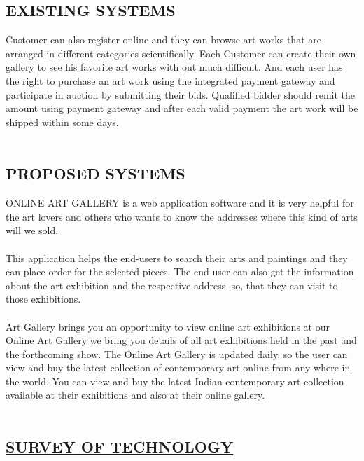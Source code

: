 \documentclass{article}
\begin{document}
\begin{center}
   \section*{\textbf{EXISTING SYSTEMS}} 
\end{center}
Customer can also register online and they can browse art works that are arranged in different categories scientifically. Each Customer can create their own gallery to see his favorite art works with out much difficult. And each user has the right to purchase an art work using the integrated payment gateway and participate in auction by submitting their bids. Qualified bidder should remit the amount using payment gateway and after each valid payment the art work will be shipped within some days.
\\
\\
\begin{center}
   \section*{\textbf{PROPOSED SYSTEMS}} 
\end{center}
ONLINE ART GALLERY is a web application software and it is very helpful for the art lovers and others who wants to know the addresses where this kind of arts will we sold.
\\
\\
This application helps the end-users to search their arts and paintings and they can place order for the selected pieces. The end-user can also get the information about the art exhibition and the respective address, so, that they can visit to those exhibitions.
\\
\\
Art Gallery brings you an opportunity to view online art exhibitions at our Online Art Gallery  we bring you details of all art exhibitions held in the past and the forthcoming show. The Online Art Gallery is updated daily, so the user can view and buy the latest collection of contemporary art online from any where in the world. You can view and buy the latest Indian contemporary art collection available at their exhibitions and also at their online gallery.
\\
\\
\begin{center}
   \section*{\underline{\textbf{SURVEY OF TECHNOLOGY}}} 
\end{center}
\end{document}
